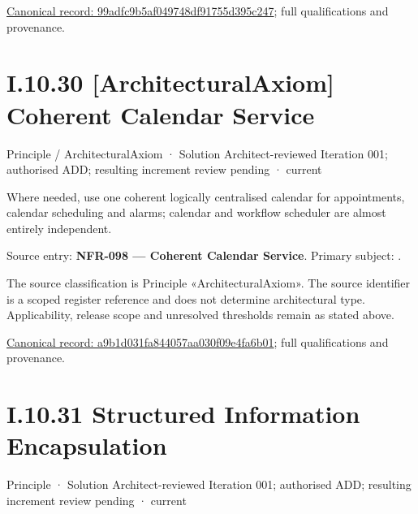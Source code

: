 {\footnotesize \href{../../../../continuum/motivation/principle/architectural-axiom/99adfc9b5af049748df91755d395c247.md}{Canonical record: 99adfc9b5af049748df91755d395c247}; full qualifications and provenance.}\par
\section*{I.10.30 [ArchitecturalAxiom] Coherent Calendar Service}
\label{navigation:I.10.30}

\label{element:a9b1d031fa844057aa030f09e4fa6b01}
{\small Principle / ArchitecturalAxiom · Solution Architect-reviewed Iteration 001; authorised ADD; resulting increment review pending · current}\par

Where needed, use one coherent logically centralised calendar for appointments, calendar scheduling and alarms; calendar and workflow scheduler are almost entirely independent.



Source entry: \textbf{NFR-098 — Coherent Calendar Service}. Primary subject: \texttt{}.



The source classification is Principle «ArchitecturalAxiom». The source identifier is a scoped register reference and does not determine architectural type. Applicability, release scope and unresolved thresholds remain as stated above.


{\footnotesize \href{../../../../continuum/motivation/principle/architectural-axiom/a9b1d031fa844057aa030f09e4fa6b01.md}{Canonical record: a9b1d031fa844057aa030f09e4fa6b01}; full qualifications and provenance.}\par
\section*{I.10.31 Structured Information Encapsulation}
\label{navigation:I.10.31}

\label{element:6973441f2d62448188af9bfce5ad9d9f}
{\small Principle · Solution Architect-reviewed Iteration 001; authorised ADD; resulting increment review pending · current}\par

